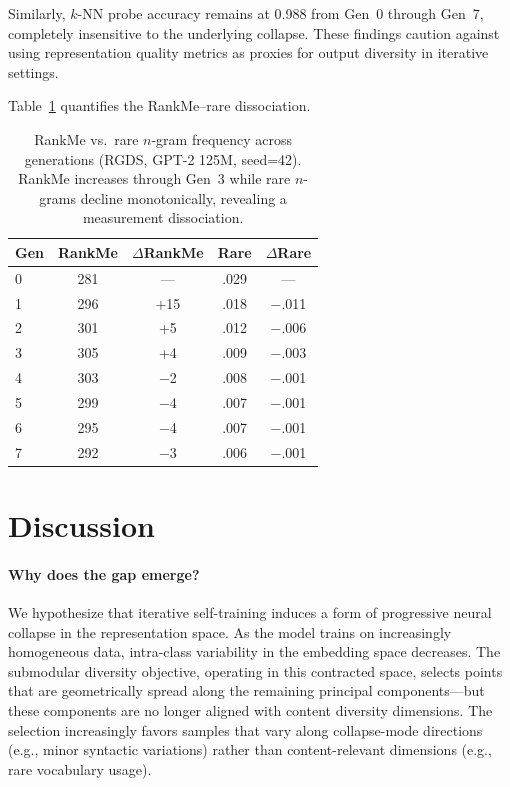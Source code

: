\documentclass[11pt,a4paper]{article}
\begin{document}
Similarly, $k$-NN probe accuracy remains at 0.988 from Gen~0 through Gen~7, completely insensitive to the underlying collapse.
These findings caution against using representation quality metrics as proxies for output diversity in iterative settings.

Table~\ref{tab:rankme} quantifies the RankMe--rare dissociation.

\begin{table}[t]
\centering
\small
\begin{tabular}{lcccc}
\toprule
Gen & RankMe & $\Delta$RankMe & Rare & $\Delta$Rare \\
\midrule
0 & 281 & --- & .029 & --- \\
1 & 296 & +15 & .018 & $-$.011 \\
2 & 301 & +5 & .012 & $-$.006 \\
3 & 305 & +4 & .009 & $-$.003 \\
4 & 303 & $-$2 & .008 & $-$.001 \\
5 & 299 & $-$4 & .007 & $-$.001 \\
6 & 295 & $-$4 & .007 & $-$.001 \\
7 & 292 & $-$3 & .006 & $-$.001 \\
\bottomrule
\end{tabular}
\caption{RankMe vs.\ rare $n$-gram frequency across generations (RGDS, GPT-2 125M, seed=42). RankMe increases through Gen~3 while rare $n$-grams decline monotonically, revealing a measurement dissociation.}
\label{tab:rankme}
\end{table}

\section{Discussion}

\paragraph{Why does the gap emerge?}
We hypothesize that iterative self-training induces a form of progressive neural collapse \cite{papyan2020prevalence} in the representation space.
As the model trains on increasingly homogeneous data, intra-class variability in the embedding space decreases.
The submodular diversity objective, operating in this contracted space, selects points that are geometrically spread along the remaining principal components---but these components are no longer aligned with content diversity dimensions.
The selection increasingly favors samples that vary along collapse-mode directions (e.g., minor syntactic variations) rather than content-relevant dimensions (e.g., rare vocabulary usage).
\end{document}

